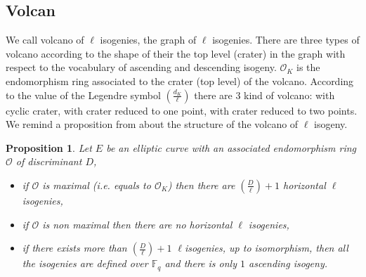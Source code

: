 \documentclass{lms}
\newtheorem{prop}[thm]{Proposition}
\begin{document}
\subsection{Volcan}
We call volcano of $\ell$ isogenies, the graph of $\ell$ isogenies. There are three types of volcano according to the shape of their the top level (crater) in the graph with respect to the vocabulary of ascending and descending isogeny. $\mathcal{O}_K$ is the endomorphism ring associated to the crater (top level) of the volcano. According to the value of the Legendre symbol $\left( \frac{d_{K}}{\ell} \right)$ there are $3$ kind of volcano: with cyclic crater, with crater reduced to one point, with crater reduced to two points. We remind a proposition from \cite{kohel} about the structure of the volcano of $\ell$ isogeny.
\begin{prop} %
Let $E$ be an elliptic curve with an associated endomorphism ring $\mathcal{O}$ of discriminant $D$, %
\begin{itemize}
\item if $\mathcal{O}$ is maximal (i.e. equals to $\mathcal{O}_K$) then there are $\left( \frac{D}{\ell} \right) +1 $ horizontal $\ell$ isogenies,
\item if $\mathcal{O}$ is non maximal then there are no horizontal $\ell$ isogenies,
\item if there exists more than $\left( \frac{D}{\ell} \right) +1 $  $\ell$isogenies, up to isomorphism, then all the isogenies are defined over $\mathbb{F}_q$ and there is only $1$ ascending isogeny. 
\end{itemize}
\end{prop} 
\end{document}
